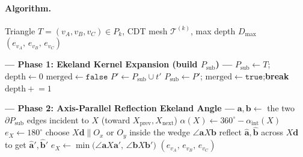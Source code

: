 \documentclass[10pt]{article}
\theoremstyle{plain}
\theoremstyle{definition}
\begin{document}
\paragraph{Algorithm.}

\begin{algorithm}[htbp]
\caption{Axis-Parallel Reflection Ekeland Angle at triangle vertices}
\label{alg:mfca}
\begin{algorithmic}[1]
\Require Triangle $T=(v_A,v_B,v_C) \in P_k$, CDT mesh $\mathcal{T}^{(k)}$,
         max depth $D_{\max}$
\Ensure $(e_{v_A},\,e_{v_B},\,e_{v_C})$

\smallskip
\State \textbf{--- Phase 1: Ekeland Kernel Expansion (build $P_{\mathrm{sub}}$) ---}
\State $P_{\mathrm{sub}} \leftarrow T$;\quad $\mathrm{depth} \leftarrow 0$
\Repeat
  \State $\mathrm{merged} \leftarrow \mathtt{false}$
    \State $P' \leftarrow P_{\mathrm{sub}} \cup t'$ \quad{}
      \State $P_{\mathrm{sub}} \leftarrow P'$;\quad
             $\mathrm{merged} \leftarrow \mathtt{true}$;\quad \textbf{break}
    \EndIf
  \EndFor
  \State $\mathrm{depth} \mathrel{+}= 1$

\smallskip
\State \textbf{--- Phase 2: Axis-Parallel Reflection Ekeland Angle ---}
  \State $\mathbf{a},\mathbf{b} \leftarrow$ the two $\partial P_{\mathrm{sub}}$ edges incident to $X$
         (toward $X_{\mathrm{prev}},X_{\mathrm{next}}$)
  \State $\alpha(X) \leftarrow 360^\circ - \alpha_{\mathrm{int}}(X)$
   
    \State $e_X \leftarrow 180^\circ$
  \Else {}
    \State choose $X\mathbf{d}\parallel O_x$ or $O_y$ inside the wedge $\angle\mathbf{a}X\mathbf{b}$
    \State reflect $\hat{\mathbf{a}},\hat{\mathbf{b}}$ across $X\mathbf{d}$ to get $\hat{\mathbf{a}}',\hat{\mathbf{b}}'$
    \State $e_X \leftarrow \min\bigl(\angle\mathbf{a}X\mathbf{a}',\,\angle\mathbf{b}X\mathbf{b}'\bigr)$
  \EndIf
\EndFor
\Return $(e_{v_A},\,e_{v_B},\,e_{v_C})$
\end{algorithmic}
\end{algorithm}
\end{document}
